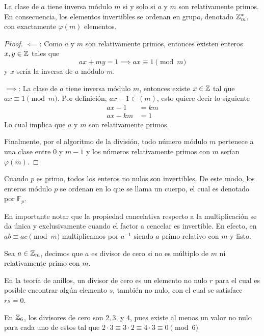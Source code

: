 \documentclass[main.tex]{subfiles}
\begin{document}
\begin{theorem}
    La clase de $a$ tiene inversa m\'odulo $m$ si y solo si $a$ y $m$ son relativamente primos. En consecuencia, los elementos invertibles se ordenan en grupo, denotado $\mathbb Z_m^*$, con exactamente $\varphi(m)$ elementos.
\end{theorem}

\begin{proof}
    $\impliedby$: Como $a$ y $m$ son relativamente primos, entonces existen enteros $x, y \in \mathbb Z$ tales que
    $$ax + my = 1 \implies ax \equiv 1 \pmod{m}$$
    y $x$ ser\'ia la inversa de $a$ m\'odulo $m$.
    
    $\implies$: La clase de $a$ tiene inversa m\'odulo $m$, entonces existe $x \in \mathbb Z$ tal que $ax \equiv 1 \pmod{m}$. Por definici\'on, $ax - 1 \in (m)$, esto quiere decir lo siguiente
    \begin{align*}
        ax - 1 &= km\\
        ax - km &= 1
    \end{align*}
    Lo cual implica que $a$ y $m$ son relativamente primos.    
    
    Finalmente, por el algoritmo de la divisi\'on, todo n\'umero m\'odulo $m$ pertenece a una clase entre $0$ y $m - 1$ y los n\'umeros relativamente primos con $m$ ser\'ian $\varphi(m)$.
\end{proof}

\begin{remark}
    Cuando $p$ es primo, todos los enteros no nulos son invertibles. De este modo, los enteros m\'odulo $p$ se ordenan en lo que se llama un cuerpo, el cual es denotado por $\mathbb{F}_p$.
\end{remark}

En importante notar que la propiedad cancelativa respecto a la multiplicaci\'on se da \'unica y exclusivamente cuando el factor a cencelar es invertible. En efecto, en $ab \equiv ac \pmod{m}$ multiplicamos por $a^{-1}$ siendo $a$ primo relativo con $m$ y listo.

\begin{defn}
    Sea $a \in \mathbb Z_m$, decimos que $a$ es divisor de cero si no es m\'ultiplo de $m$ ni relativamente primo con $m$.
\end{defn}

En la teor\'ia de anillos, un divisor de cero es un elemento no nulo $r$ para el cual es posible encontrar alg\'un elemento $s$, tambi\'en no nulo, con el cual se satisface $rs = 0$.

\begin{example}
    En $\mathbb Z_6$, los divisores de cero son $2, 3$, y $4$, pues existe al menos un valor no nulo para cada uno de estos tal que $2\cdot3\equiv3\cdot2 \equiv 4\cdot3\equiv0\pmod{6}$
\end{example}
\end{document}
